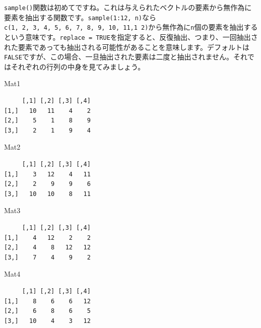 \documentclass[
  a4paper,
  pandoc,
  ja=standard,
  jafont=haranoaji]{bxjsbook}
\newenvironment{Shaded}{\begin{snugshade}}{\end{snugshade}}
\newcommand{\NormalTok}[1]{\textcolor[rgb]{0.00,0.48,0.65}{#1}}
\begin{document}
\texttt{sample()}関数は初めてですね。これは与えられたベクトルの要素から無作為に要素を抽出する関数です。\texttt{sample(1:12,\ n)}なら\texttt{c(1,\ 2,\ 3,\ 4,\ 5,\ 6,\ 7,\ 8,\ 9,\ 10,\ 11,1\ 2)}から無作為に\texttt{n}個の要素を抽出するという意味です。\texttt{replace\ =\ TRUE}を指定すると、反復抽出、つまり、一回抽出された要素であっても抽出される可能性があることを意味します。デフォルトは\texttt{FALSE}ですが、この場合、一旦抽出された要素は二度と抽出されません。それではそれぞれの行列の中身を見てみましょう。

\begin{Shaded}
\begin{Highlighting}[numbers=left,,]
\NormalTok{Mat1}
\end{Highlighting}
\end{Shaded}

\begin{verbatim}
     [,1] [,2] [,3] [,4]
[1,]   10   11    4    2
[2,]    5    1    8    9
[3,]    2    1    9    4
\end{verbatim}

\begin{Shaded}
\begin{Highlighting}[numbers=left,,]
\NormalTok{Mat2}
\end{Highlighting}
\end{Shaded}

\begin{verbatim}
     [,1] [,2] [,3] [,4]
[1,]    3   12    4   11
[2,]    2    9    9    6
[3,]   10   10    8   11
\end{verbatim}

\begin{Shaded}
\begin{Highlighting}[numbers=left,,]
\NormalTok{Mat3}
\end{Highlighting}
\end{Shaded}

\begin{verbatim}
     [,1] [,2] [,3] [,4]
[1,]    4   12    2    2
[2,]    4    8   12   12
[3,]    7    4    9    2
\end{verbatim}

\begin{Shaded}
\begin{Highlighting}[numbers=left,,]
\NormalTok{Mat4}
\end{Highlighting}
\end{Shaded}

\begin{verbatim}
     [,1] [,2] [,3] [,4]
[1,]    8    6    6   12
[2,]    6    8    6    5
[3,]   10    4    3   12
\end{verbatim}
\end{document}
